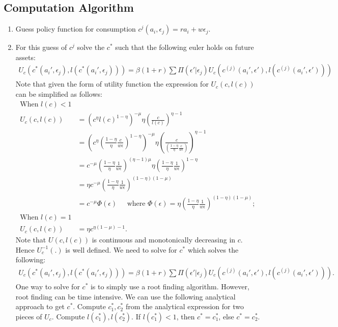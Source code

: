 \documentclass[12pt]{article}
\begin{document}
\subsection{Computation Algorithm}
\begin{enumerate}
\item Guess policy function for consumption $c^j(a_i, \epsilon_j) = ra_i + w \epsilon_j$.
\item For this guess of $c^j$ solve the $c^*$ such that the following euler holds on future assets:
\begin{align*}
U_c(c^*(a_i', \epsilon_j), l(c^*(a_i', \epsilon_j))) = \beta(1+r) \sum \Pi(\epsilon'|\epsilon_j) U_c(c^{(j)}(a_i', \epsilon'), l(c^{(j)}(a_i', \epsilon')))
\end{align*}
Note that given the form of utility function the expression for $U_c(c, l(c))$ can be simplified as follows:
\begin{align*}
 \text{When  } l(c) < 1\\ 
U_c(c, l(c)) & =  (c^\eta l(c)^{1-\eta})^{-\mu} \eta (\frac{c}{l(c)})^{\eta -1} \\
 & = (c^\eta (\frac{1-\eta}{\eta}\frac{c}{w\epsilon })^{1-\eta})^{-\mu} \eta (\frac{c}{(\frac{1-\eta}{\eta}\frac{c}{w\epsilon })})^{\eta -1} \\
 & = c^{-\mu} (\frac{1-\eta}{\eta}\frac{1}{w\epsilon })^{(\eta-1)\mu} \eta (\frac{1-\eta}{\eta}\frac{1}{w\epsilon })^{1-\eta} \\
 & = \eta c^{-\mu} (\frac{1-\eta}{\eta}\frac{1}{w\epsilon })^{(1-\eta)(1-\mu)}\\
 & = c^{-\mu} \Phi(\epsilon) \; \; \; \; \; \text{where  } \Phi(\epsilon)  = \eta (\frac{1-\eta}{\eta}\frac{1}{w\epsilon })^{(1-\eta)(1-\mu)};\\
 \text{When  } l(c) = 1\\ 
 U_c(c, l(c)) & = \eta c^{\eta(1-\mu)-1}.
\end{align*}
Note that $U(c, l(c))$ is continuous and monotonically decreasing in $c$. Hence $U_c^{-1}(.)$ is well defined. We need to solve for $c^*$ which solves the following:
\begin{align*}
U_c(c^*(a_i', \epsilon_j), l(c^*(a_i', \epsilon_j))) = \beta(1+r) \sum \Pi(\epsilon'|\epsilon_j) U_c(c^{(j)}(a_i', \epsilon'), l(c^{(j)}(a_i', \epsilon'))).
\end{align*}
One way to solve for $c^*$ is to simply use a root finding algorithm. However, root finding can be time intensive. We can use the following analytical approach to get $c^*$. Compute $c^*_1, c^*_2$ from the analytical expression for two pieces of $U_c$. Compute $l(c^*_1), l(c^*_2)$. If $l(c_1^*) <1$, then $c^* = c^*_1$, else $c^* = c_2^*$. 

\end{enumerate}
\end{document}
